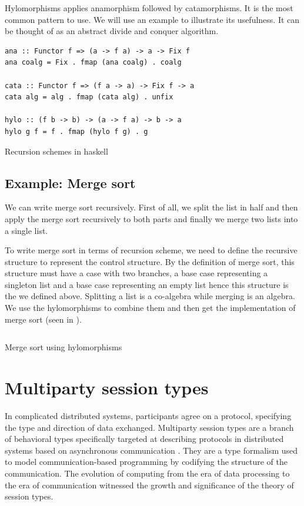 Hylomorphisms applies anamorphism followed by catamorphisms. It is the most common pattern to use. We will use an example to illustrate its usefulness. It can be thought of as an abstract divide and conquer algorithm.

\begin{listing}[ht]
\begin{verbatim}
ana :: Functor f => (a -> f a) -> a -> Fix f
ana coalg = Fix . fmap (ana coalg) . coalg

cata :: Functor f => (f a -> a) -> Fix f -> a
cata alg = alg . fmap (cata alg) . unfix

hylo :: (f b -> b) -> (a -> f a) -> b -> a 
hylo g f = f . fmap (hylo f g) . g
\end{verbatim}
\caption{Recursion schemes in haskell} \label{p:pal:c3}
\end{listing}

\subsection{Example: Merge sort} \label{b:rs:ex}
We can write merge sort recursively. First of all, we split the list in half and then apply the merge sort recursively to both parts and finally we merge two lists into a single list. 

To write merge sort in terms of recursion scheme, we need to define the recursive structure to represent the control structure. By the definition of merge sort, this structure must have a case with two branches, a base case representing a singleton list and a base case representing an empty list hence this structure is the  we defined above. Splitting a list is a co-algebra while merging is an algebra. We use the hylomorphisms to combine them and then get the implementation of merge sort (seen in ).

\begin{listing}[ht]
\inputminted{haskell}{project/pal-ms.hs}
\caption{Merge sort using hylomorphisms} \label{p:pal:c4}
\end{listing}
\section{Multiparty session types} \label{b:mpst}
In complicated distributed systems, participants agree on a protocol, specifying the type and direction of data exchanged. Multiparty session types are a branch of behavioral types specifically targeted at describing protocols in distributed systems based on asynchronous communication \cite{coppoGentleIntroductionMultiparty2015}. They are a type formalism used to model communication-based programming by codifying the structure of the communication. The evolution of computing from the era of data processing to the era of communication witnessed the growth and significance of the theory of session types.

